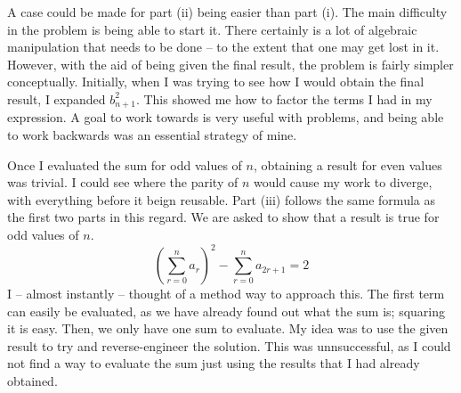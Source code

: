 \documentclass[a4paper]{article}
\begin{document}
A case could be made for part (ii) being easier than part (i).
The main difficulty in the problem is being able to start it.
There certainly is a lot of algebraic manipulation that needs to be done -- to the extent that one may get lost in it.
However, with the aid of being given the final result, the problem is fairly simpler conceptually.
Initially, when I was trying to see how I would obtain the final result, I expanded $b^2_{n+1}$.
This showed me how to factor the terms I had in my expression.
A goal to work towards is very useful with problems, and being able to work backwards was an essential strategy of mine.

Once I evaluated the sum for odd values of $n$, obtaining a result for even values was trivial.
I could see where the parity of $n$ would cause my work to diverge, with everything before it beign reusable.
Part (iii) follows the same formula as the first two parts in this regard.
We are asked to show that a result is true for odd values of $n$.
\begin{equation}
    \left(\sum_{r=0}^{n} a_r \right)^2 - \sum_{r=0}^{n} a_{2r+1} = 2
\end{equation}
I -- almost instantly -- thought of a method way to approach this.
The first term can easily be evaluated, as we have already found out what the sum is; squaring it is easy.
Then, we only have one sum to evaluate.
My idea was to use the given result to try and reverse-engineer the solution.
This was unnsuccessful, as I could not find a way to evaluate the sum just using the results that I had already obtained.
\end{document}
